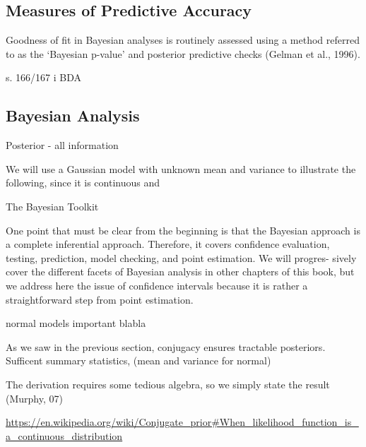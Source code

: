 \subsection{Measures of Predictive Accuracy}

Goodness of fit in Bayesian analyses is routinely assessed using a method referred to as the ‘Bayesian p-value’ and posterior predictive checks (Gelman et al., 1996).

s. 166/167 i BDA 

\subsection{Bayesian Analysis}


Posterior - all information

We will use a Gaussian model with unknown mean and variance to illustrate the following, since it is continuous and

The Bayesian Toolkit

One point that must be clear from the beginning is that the Bayesian approach is a complete inferential approach. Therefore, it covers confidence evaluation, testing, prediction, model checking, and point estimation. We will progres- sively cover the different facets of Bayesian analysis in other chapters of this book, but we address here the issue of confidence intervals because it is rather a straightforward step from point estimation.

normal models important blabla

As we saw in the previous section, conjugacy ensures tractable posteriors. Sufficent summary statistics, (mean and variance for normal)

The derivation requires some tedious algebra, so we simply state the result (Murphy, 07)

\url{https://en.wikipedia.org/wiki/Conjugate_prior#When_likelihood_function_is_a_continuous_distribution}


